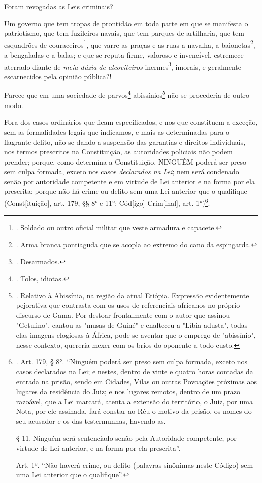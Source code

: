 Foram revogadas as Leis criminais?

Um governo que tem tropas de prontidão em toda parte em que se manifesta
o patriotismo, que tem fuzileiros navais, que tem parques de artilharia,
que tem esquadrões de couraceiros\footnote{. Soldado ou outro oficial
  militar que veste armadura e capacete.}, que varre as praças e as ruas
a navalha, a baionetas\footnote{. Arma branca pontiaguda que se acopla
  ao extremo do cano da espingarda.}, a bengaladas e a balas; e que se
reputa firme, valoroso e invencível, estremece aterrado diante de
\emph{meia dúzia de alcoviteiros} inermes\footnote{. Desarmados.},
imorais, e geralmente escarnecidos pela opinião pública?!

Parece que em uma sociedade de parvos\footnote{. Tolos, idiotas.}
abissínios\footnote{. Relativo à Abissínia, na região da atual Etiópia.
  Expressão evidentemente pejorativa que contrasta com os usos de
  referenciais africanos no próprio discurso de Gama. Por destoar
  frontalmente com o autor que assinou "Getulino", cantou as "musas de
  Guiné" e enalteceu a "Líbia adusta", todas elas imagens elogiosas à
  África, pode-se aventar que o emprego de "abissínio", nesse contexto,
  quereria mexer com os brios do oponente a todo custo.} não se
procederia de outro modo.

Fora dos casos ordinários que ficam especificados, e nos que constituem
a exceção, sem as formalidades legais que indicamos, e mais as
determinadas para o flagrante delito, não se dando a suspensão das
garantias e direitos individuais, nos termos prescritos na Constituição,
as autoridades policiais não podem prender; porque, como determina a
Constituição, NINGUÉM poderá ser preso sem culpa formada, exceto nos
casos \emph{declarados na Lei}; nem será condenado senão por autoridade
competente e em virtude de Lei anterior e na forma por ela prescrita;
porque não há crime ou delito sem uma Lei anterior que o qualifique
(Const{[}ituição{]}, art. 179, §§ 8° e 11°; Cód{[}igo{]} Crim{[}inal{]},
art. 1°)\footnote{. Art. 179, § 8°. ``Ninguém poderá ser preso sem culpa
  formada, exceto nos casos declarados na Lei; e nestes, dentro de vinte
  e quatro horas contadas da entrada na prisão, sendo em Cidades, Vilas
  ou outras Povoações próximas aos lugares da residência do Juiz; e nos
  lugares remotos, dentro de um prazo razoável, que a Lei marcará,
  atenta a extensão do território, o Juiz, por uma Nota, por ele
  assinada, fará constar ao Réu o motivo da prisão, os nomes do seu
  acusador e os das testermunhas, havendo-as.

  § 11. Ninguém será sentenciado senão pela Autoridade competente, por
  virtude de Lei anterior, e na forma por ela prescrita''.

  Art. 1º. ``Não haverá crime, ou delito (palavras sinônimas neste
  Código) sem uma Lei anterior que o qualifique''.}.

